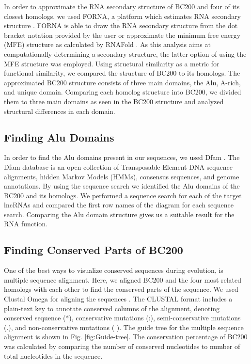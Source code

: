 \documentclass[conference, 11pt]{IEEEtran}
\begin{document}
In order to approximate the RNA secondary structure of BC200 and four of its closest homologs, we used FORNA, a platform which estimates RNA secondary structure \cite{kerpedjiev2015forna}. 
FORNA is able to draw the RNA secondary structure from the dot bracket notation provided by the user or approximate the minimum free energy (MFE) structure as calculated by RNAFold \cite{lorenz2011viennarna}. 
As this analysis aims at computationally determining a secondary structure, the latter option of using the MFE structure was employed. 
Using structural similarity as a metric for functional similarity, we compared the structure of BC200 to its homologs.
The approximated BC200 structure consists of three main domains, the Alu, A-rich, and unique domain. 
Comparing each homolog structure into BC200, we divided them to three main domains as seen in the BC200 structure and analyzed structural differences in each domain.

\subsection{Finding Alu Domains}

In order to find the Alu domains present in our sequences, we used Dfam \cite{storer2021dfam}. 
The Dfam database is an open collection of Transposable Element DNA sequence alignments, hidden Markov Models (HMMs), consensus sequences, and genome annotations. 
By using the sequence search we identified the Alu domains of the BC200 and its homologs. 
We performed a sequence search for each of the target lncRNAs and compared the first row names of the diagram for each sequence search. 
Comparing the Alu domain structure gives us a suitable result for the RNA function.

\subsection{Finding Conserved Parts of BC200}

One of the best ways to visualize conserved sequences during evolution, is multiple sequence alignment. 
Here, we aligned BC200 and the four most related homologs with each other to find the conserved parts of the sequence. 
We used Clustal Omega for aligning the sequences \cite{madeira2019embl}. 
The CLUSTAL format includes a plain-text key to annotate conserved columns of the alignment, denoting conserved sequence (*), conservative mutations (:), semi-conservative mutations (.), and non-conservative mutations ( ). 
The guide tree for the multiple sequence alignment is shown in Fig. \ref{fig:Guide-tree}. 
The conservation percentage of BC200 was calculated by comparing the number of conserved nucleotides to number of total nucleotides in the sequence.
\end{document}
